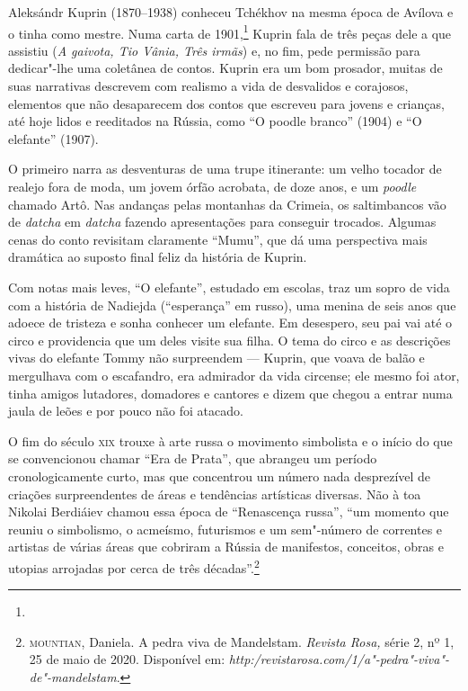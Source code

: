 Aleksándr Kuprin (1870--1938) conheceu Tchékhov na mesma época de
Avílova e o tinha como mestre. Numa carta de 1901,\footnote{} Kuprin fala de três peças
dele a que assistiu (\emph{A gaivota, Tio Vânia, Três irmãs}) e, no fim,
pede permissão para dedicar"-lhe uma coletânea de contos. Kuprin era um
bom prosador, muitas de suas narrativas descrevem com realismo a vida de
desvalidos e corajosos, elementos que não desaparecem dos contos que
escreveu para jovens e crianças, até hoje lidos e reeditados na Rússia,
como ``O poodle branco'' (1904) e ``O elefante'' (1907).

O primeiro narra as desventuras de uma trupe itinerante:
um velho tocador de realejo fora de moda, um jovem órfão acrobata, de
doze anos, e um \textit{poodle} chamado Artô. Nas andanças pelas montanhas da
Crimeia, os saltimbancos vão de \emph{datcha} em \emph{datcha} fazendo
apresentações para conseguir trocados. Algumas cenas do conto revisitam
claramente ``Mumu'', que dá uma perspectiva mais dramática ao
suposto final feliz da história de Kuprin.

Com notas mais leves, ``O elefante'', estudado em escolas, traz um sopro
de vida com a história de Nadiejda (``esperança'' em russo), uma menina
de seis anos que adoece de tristeza e sonha conhecer um elefante. Em
desespero, seu pai vai até o circo e providencia que um deles visite sua
filha. O tema do circo e as descrições vivas do elefante Tommy não
surpreendem --- Kuprin, que voava de balão e mergulhava com o
escafandro, era admirador da vida circense; ele mesmo foi ator, tinha amigos
lutadores, domadores e cantores e dizem que chegou a entrar numa jaula
de leões e por pouco não foi atacado.

O fim do século \textsc{xix} trouxe à arte russa o movimento simbolista e o
início do que se convencionou chamar ``Era de Prata'', que abrangeu um
período cronologicamente curto, mas que concentrou um número nada
desprezível de criações surpreendentes de áreas e tendências artísticas
diversas. Não à toa Nikolai Berdiáiev chamou essa época de ``Renascença
russa'', ``um momento que reuniu o simbolismo, o acmeísmo, futurismos e
um sem"-número de correntes e artistas de várias áreas que cobriram a
Rússia de manifestos, conceitos, obras e utopias arrojadas por cerca de
três décadas''.\footnote{\textsc{mountian}, Daniela. A pedra viva de Mandelstam.
  \emph{Revista Rosa,} série 2, nº 1, 25 de maio de 2020. Disponível em:
  \emph{http:/revistarosa.com/1/a"-pedra"-viva"-de"-mandelstam}.}

